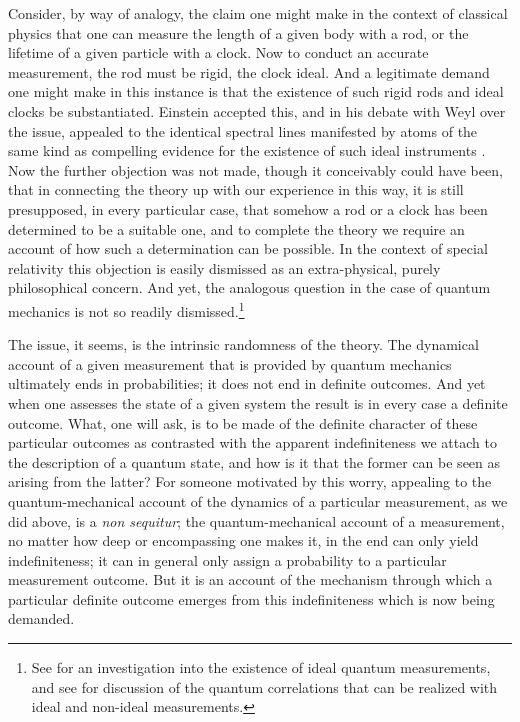 Consider, by way of analogy, the claim one might make in the context of classical physics that one can measure the length of a given body with a rod, or the lifetime of a given particle with a clock. Now to conduct an accurate measurement, the rod must be rigid, the clock ideal. And a legitimate demand one might make in this instance is that the existence of such rigid rods and ideal clocks be substantiated. Einstein accepted this, and in his debate with Weyl over the issue, appealed to the identical spectral lines manifested by atoms of the same kind as compelling evidence for the existence of such ideal instruments \citep[see][]{Giovanelli 2014}. Now the further objection was not made, though it conceivably could have been, that in connecting the theory up with our experience in this way, it is still presupposed, in every particular case, that somehow a rod or a clock has been determined to be a suitable one, and to complete the theory we require an account of how such a determination can be possible. In the context of special relativity this objection is easily dismissed as an extra-physical, purely philosophical concern. And yet, the analogous question in the case of quantum mechanics is not so readily dismissed.\footnote{See \citet{Pokorny et al 2019} for an investigation into the existence of ideal quantum measurements, and see \citet[]{Cabello 2019} for discussion of the quantum correlations that can be realized with ideal and non-ideal measurements.}

The issue, it seems, is the intrinsic randomness of the theory. The dynamical account of a given measurement that is provided by quantum mechanics ultimately ends in probabilities; it does not end in definite outcomes. And yet when one assesses the state of a given system the result is in every case a definite outcome. What, one will ask, is to be made of the definite character of these particular outcomes as contrasted with the apparent indefiniteness we attach to the description of a quantum state, and how is it that the former can be seen as arising from the latter? For someone motivated by this worry, appealing to the quantum-mechanical account of the dynamics of a particular measurement, as we did above, is a \emph{non sequitur}; the quantum-mechanical account of a measurement, no matter how deep or encompassing one makes it, in the end can only yield indefiniteness; it can in general only assign a probability to a particular measurement outcome. But it is an account of the mechanism through which a particular definite outcome emerges from this indefiniteness which is now being demanded.

